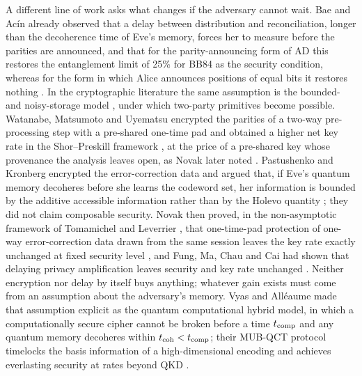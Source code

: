 \documentclass[aps,pra,twocolumn,superscriptaddress,nofootinbib]{revtex4-2}
\begin{document}
A different line of work asks what changes if the adversary cannot wait. Bae and Acín already observed that a delay between distribution and reconciliation, longer than the decoherence time of Eve's memory, forces her to measure before the parities are announced, and that for the parity-announcing form of AD this restores the entanglement limit of 25\% for BB84 as the security condition, whereas for the form in which Alice announces positions of equal bits it restores nothing \cite{BA07}. In the cryptographic literature the same assumption is the bounded- and noisy-storage model \cite{DFSS05,WST08,KWW12}, under which two-party primitives become possible. Watanabe, Matsumoto and Uyematsu encrypted the parities of a two-way pre-processing step with a pre-shared one-time pad and obtained a higher net key rate in the Shor--Preskill framework \cite{WMU06}, at the price of a pre-shared key whose provenance the analysis leaves open, as Novak later noted \cite{Novak25}. Pastushenko and Kronberg encrypted the error-correction data and argued that, if Eve's quantum memory decoheres before she learns the codeword set, her information is bounded by the additive accessible information rather than by the Holevo quantity \cite{PK23}; they did not claim composable security. Novak then proved, in the non-asymptotic framework of Tomamichel and Leverrier \cite{TL17}, that one-time-pad protection of one-way error-correction data drawn from the same session leaves the key rate exactly unchanged at fixed security level \cite{Novak25}, and Fung, Ma, Chau and Cai had shown that delaying privacy amplification leaves security and key rate unchanged \cite{FMCC12}. Neither encryption nor delay by itself buys anything; whatever gain exists must come from an assumption about the adversary's memory. Vyas and Alléaume made that assumption explicit as the quantum computational hybrid model, in which a computationally secure cipher cannot be broken before a time $t_{\rm comp}$ and any quantum memory decoheres within $t_{\rm coh}<t_{\rm comp}$; their MUB-QCT protocol timelocks the basis information of a high-dimensional encoding and achieves everlasting security at rates beyond QKD \cite{VA20,MBBA25}.
\end{document}
